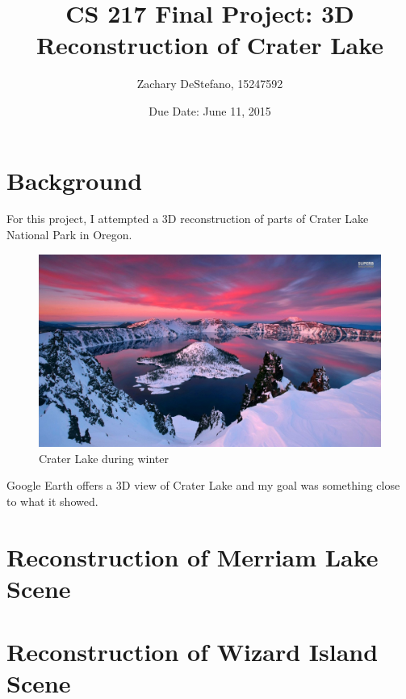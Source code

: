 \documentclass[11pt,psfig]{article}
\begin{document}
\setlength{\parskip}{1.2ex plus0.3ex minus 0.3ex}


\thispagestyle{empty} \pagestyle{myheadings} 

\title{CS 217 Final Project: 3D Reconstruction of Crater Lake}
\author{Zachary DeStefano, 15247592}
\date{Due Date: June 11, 2015}

\maketitle

\vfill\eject

\newpage

\section{Background}

For this project, I attempted a 3D reconstruction of parts of Crater Lake National Park in Oregon.
\begin{figure}[H]
\centering
\includegraphics[width=\columnwidth]{craterLakeWinter.jpg}
\caption{Crater Lake during winter}
\end{figure}
Google Earth offers a 3D view of Crater Lake and my goal was something close to what it showed.   

\newpage

\section{Reconstruction of Merriam Lake Scene}

\newpage

\section{Reconstruction of Wizard Island Scene}


\end{document}
